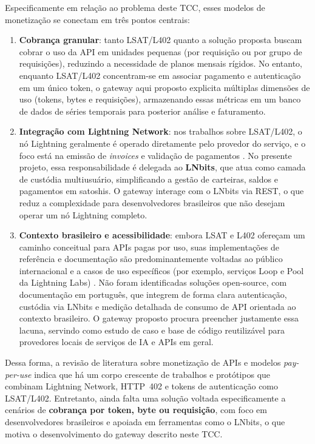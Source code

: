 \documentclass[openright]{normas-utf-tex}
\begin{document}
Especificamente em relação ao problema deste TCC, esses modelos de monetização se conectam em três pontos centrais:

\begin{enumerate}
    \item \textbf{Cobrança granular}: tanto LSAT/L402 quanto a solução proposta buscam cobrar o uso da API em unidades pequenas (por requisição ou por grupo de requisições), reduzindo a necessidade de planos mensais rígidos. No entanto, enquanto LSAT/L402 concentram-se em associar pagamento e autenticação em um único token, o gateway aqui proposto explicita múltiplas dimensões de uso (tokens, bytes e requisições), armazenando essas métricas em um banco de dados de séries temporais para posterior análise e faturamento.
    \item \textbf{Integração com Lightning Network}: nos trabalhos sobre LSAT/L402, o nó Lightning geralmente é operado diretamente pelo provedor do serviço, e o foco está na emissão de \textit{invoices} e validação de pagamentos \cite{lsat,l402spec}. No presente projeto, essa responsabilidade é delegada ao \textbf{LNbits}, que atua como camada de custódia multiusuário, simplificando a gestão de carteiras, saldos e pagamentos em satoshis. O gateway interage com o LNbits via REST, o que reduz a complexidade para desenvolvedores brasileiros que não desejam operar um nó Lightning completo.
    \item \textbf{Contexto brasileiro e acessibilidade}: embora LSAT e L402 ofereçam um caminho conceitual para APIs pagas por uso, suas implementações de referência e documentação são predominantemente voltadas ao público internacional e a casos de uso específicos (por exemplo, serviços Loop e Pool da Lightning Labs) \cite{l402docs}. Não foram identificadas soluções open-source, com documentação em português, que integrem de forma clara autenticação, custódia via LNbits e medição detalhada de consumo de API orientada ao contexto brasileiro. O gateway proposto procura preencher justamente essa lacuna, servindo como estudo de caso e base de código reutilizável para provedores locais de serviços de IA e APIs em geral.
\end{enumerate}

Dessa forma, a revisão de literatura sobre monetização de APIs e modelos \textit{pay-per-use} indica que há um corpo crescente de trabalhos e protótipos que combinam Lightning Network, HTTP~402 e tokens de autenticação como LSAT/L402. Entretanto, ainda falta uma solução voltada especificamente a cenários de \textbf{cobrança por token, byte ou requisição}, com foco em desenvolvedores brasileiros e apoiada em ferramentas como o LNbits, o que motiva o desenvolvimento do gateway descrito neste TCC.
\end{document}
